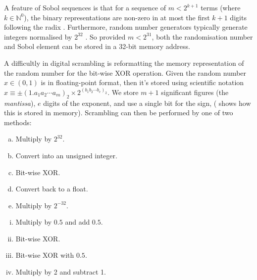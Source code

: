 \documentclass[a0paper,portrait,fontscale=0.40]{baposter}
\begin{document}
\begin{poster}
{		
	A feature of Sobol sequences is that for a sequence of $ m < 2^{k+1} $ terms (where $ k \in \mathbb{N}^0 $), the binary representations are non-zero in at most the first $ k + 1 $ digits following the radix \citep[3.2.2]{gentle2005random}.
	Furthermore, random number generators typically generate integers \citep[4.2.1]{tezuka1995uniform} normalised by $ 2^{32}$ \citep[1.3.2, pg.\,172]{gentle2005random}. So provided $ m < 2^{31} $, both the randomisation number and Sobol element can be stored in a 32-bit memory address.  


  }
  
  {
  	

  		  	
	  	A difficultly in digital scrambling is reformatting the memory representation of the random number for the bit-wise XOR operation. Given the random number $ x \in (0, 1) $ is in floating-point format, then it's stored using scientific notation  $ x  \equiv \pm (1.a_1a_2\cdots a_m)_2 \times 2^{(b_1b_2\cdots b_e)_2} $. We store $ m + 1 $ significant figures (the \textit{mantissa}),  $ e $ digits of the exponent, and use a single bit for the sign,  ( shows how this is stored in memory). Scrambling can then be performed by one of two methods: \\
\begin{minipage}[t]{\linewidth}
\centering
\begin{minipage}[t]{0.4\linewidth}
\begin{enumerate}[a)]
\item Multiply by $ 2^{32} $.
\item Convert into an unsigned integer. 
\item Bit-wise XOR. 
\item Convert back to a float. 
\item Multiply by $ 2^{-32} $. 
\end{enumerate}
\end{minipage} 
\begin{minipage}[t]{0.4\linewidth}
\begin{enumerate}[i)]
\item Multiply by $ 0.5 $ and add $ 0.5 $. 
\item Bit-wise XOR. 
\item Bit-wise XOR with $ 0.5 $. 
\item Multiply by 2 and subtract 1. 
\end{enumerate}
\end{minipage} 
\end{minipage}

}
\end{poster}
\end{document}
